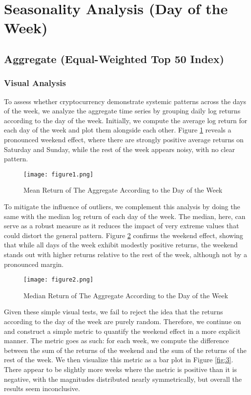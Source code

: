 \documentclass[
]{article}
\begin{document}
\section{Seasonality Analysis (Day of the
Week)}\label{seasonality-analysis-day-of-the-week}

\subsection{Aggregate (Equal-Weighted Top 50
Index)}\label{aggregate-equal-weighted-top-50-index}

\subsubsection{Visual Analysis}\label{visual-analysis}

To assess whether cryptocurrency demonstrate systemic patterns across
the days of the week, we analyze the aggregate time series by grouping
daily log returns according to the day of the week. Initially, we
compute the average log return for each day of the week and plot them
alongside each other. Figure \textcolor{blue}{\ref{fig:1}} reveals a
pronounced weekend effect, where there are strongly positive average
returns on Saturday and Sunday, while the rest of the week appears
noisy, with no clear pattern.

\begin{figure}
    \centering
    \texttt{[image: figure1.png]}
    \caption{Mean Return of The Aggregate According to the Day of the Week}
    \label{fig:1}
\end{figure}

To mitigate the influence of outliers, we complement this analysis by
doing the same with the median log return of each day of the week. The
median, here, can serve as a robust measure as it reduces the impact of
very extreme values that could distort the general pattern. Figure
\textcolor{blue}{\ref{fig:2}} confirms the weekend effect, showing that
while all days of the week exhibit modestly positive returns, the
weekend stands out with higher returns relative to the rest of the week,
although not by a pronounced margin.

\begin{figure}
    \centering
    \texttt{[image: figure2.png]}
    \caption{Median Return of The Aggregate According to the Day of the Week}
    \label{fig:2}
\end{figure}

Given these simple visual tests, we fail to reject the idea that the
returns according to the day of the week are purely random. Therefore,
we continue on and construct a simple metric to quantify the weekend
effect in a more explicit manner. The metric goes as such: for each
week, we compute the difference between the sum of the returns of the
weekend and the sum of the returns of the rest of the week. We then
visualize this metric as a bar plot in Figure
\textcolor{blue}{\ref{fig:3}}. There appear to be slightly more weeks
where the metric is positive than it is negative, with the magnitudes
distributed nearly symmetrically, but overall the results seem
inconclusive.
\end{document}
